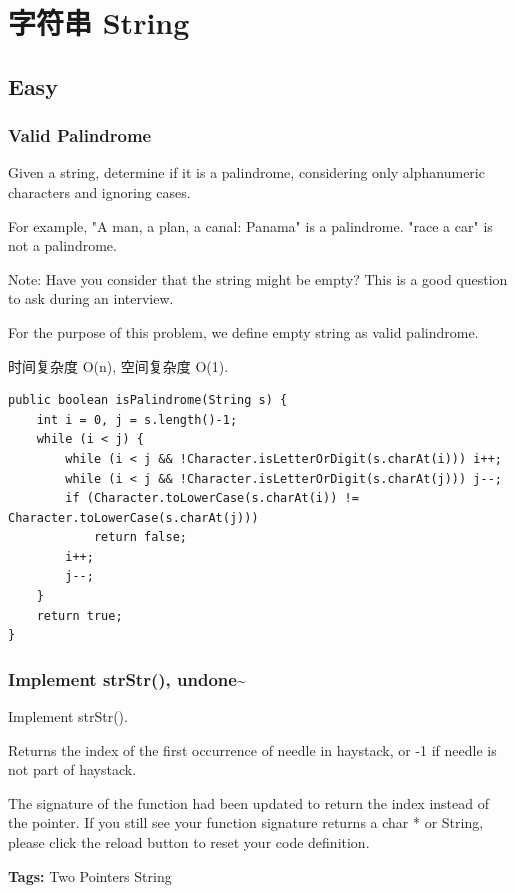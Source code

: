 \documentclass[12pt]{book}
\begin{document}
\chapter{字符串 String}
\label{sec-2}
\section{Easy}
\label{sec-2-1}
\subsection{Valid Palindrome}
\label{sec-2-1-1}
Given a string, determine if it is a palindrome, considering only alphanumeric characters and ignoring cases.

For example,
"A man, a plan, a canal: Panama" is a palindrome.
"race a car" is not a palindrome.

Note:
Have you consider that the string might be empty? This is a good question to ask during an interview.

For the purpose of this problem, we define empty string as valid
palindrome.

时间复杂度 O(n), 空间复杂度 O(1). 

\lstset{language=java,label= ,caption= ,numbers=none}
\begin{lstlisting}
public boolean isPalindrome(String s) {
    int i = 0, j = s.length()-1;
    while (i < j) {
        while (i < j && !Character.isLetterOrDigit(s.charAt(i))) i++;
        while (i < j && !Character.isLetterOrDigit(s.charAt(j))) j--;
        if (Character.toLowerCase(s.charAt(i)) != Character.toLowerCase(s.charAt(j)))
            return false;
        i++;
        j--;
    }
    return true;
}
\end{lstlisting}

\subsection{Implement strStr(), undone\textasciitilde{}~}
\label{sec-2-1-2}
Implement strStr().

Returns the index of the first occurrence of needle in haystack, or -1 if needle is not part of haystack.

The signature of the function had been updated to return the index instead of the pointer. If you still see your function signature returns a char * or String, please click the reload button  to reset your code definition.

\textbf{Tags:} Two Pointers String
\end{document}
